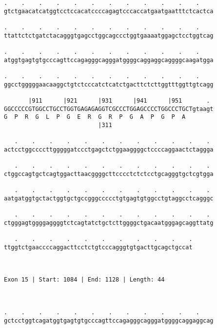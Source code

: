 \documentclass{article}
\begin{document}
\begin{Verbatim}
.    .    .    .    .    .    .    .    .    .    .    .    
gtctgaacatcatggtcctccacatccccagagtcccaccatgaatgaatttctcactca
                                                            
.    .    .    .    .    .    .    .    .    .    .    .    
ttattctctgatctacagggtgagcctggcagccctggtgaaaatggagctcctggtcag
                                                            
.    .    .    .    .    .    .    .    .    .    .    .    
atggtgagtgtgcccagttccagagggcagggatggggcaggaggcaggggcaagatgga
                                                            
.    .    .    .    .    .    .    .    .    .    .    .    
ggcctgggggaacaaggctgtctcccatctcatctgacttctcttggtttggttgtcagg
                                                            
       |911      |921      |931      |941      |951       . 
GGCCCCCGTGGCCTGCCTGGTGAGAGAGGTCGCCCTGGAGCCCCTGGCCCTGCTgtaagt
G  P  R  G  L  P  G  E  R  G  R  P  G  A  P  G  P  A        
                           |311                             
  
   .    .    .    .    .    .    .    .    .    .    .    . 
actcctggccccttgggggatccctgagctctggaaggggctccccaggaactctaggga
                                                            
   .    .    .    .    .    .    .    .    .    .    .    . 
ctggccagtgctcagtggacttaacggggcttcccctctctcctgcagggtgctcgtgga
                                                            
   .    .    .    .    .    .    .    .    .    .    .    . 
aatgatggtgctactggtgctgccgggccccctgtgagtgtggcctgtaggcctcagggc
                                                            
   .    .    .    .    .    .    .    .    .    .    .    . 
ctgggagtggggaggggtctcagtatctgctcttggggctgacaatgggagcaggttatg
                                                            
   .    .    .    .    .    .    .    .    .    .    .
ttggtctgaaccccaggacttcctctgtcccagggtgtgacttgcagctgccat
                                                      
                                                      
 
Exon 15 | Start: 1084 | End: 1128 | Length: 44



.    .    .    .    .    .    .    .    .    .    .    .    
gctcctggtcagatggtgagtgtgcccagttccagagggcagggatggggcaggaggcag
                                                            

\end{Verbatim}
\end{document}

